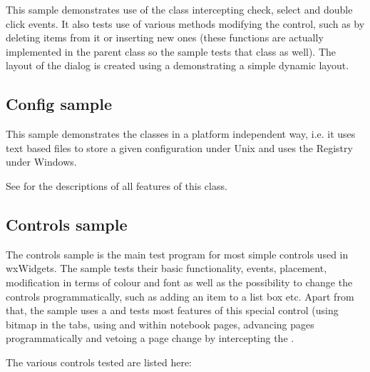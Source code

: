 This sample demonstrates use of the 
class intercepting check, select and double click events. It also tests
use of various methods modifying the control, such as by deleting items
from it or inserting new ones (these functions are actually implemented in
the parent class  so the sample tests that class
as well). The layout of the dialog is created using a 
demonstrating a simple dynamic layout.


\subsection{Config sample}\label{sampleconfig}

This sample demonstrates the  classes in a platform
independent way, i.e. it uses text based files to store a given configuration under
Unix and uses the Registry under Windows.

See  for the descriptions of all
features of this class.


\subsection{Controls sample}\label{samplecontrols}

The controls sample is the main test program for most simple controls used in
wxWidgets. The sample tests their basic functionality, events, placement,
modification in terms of colour and font as well as the possibility to change
the controls programmatically, such as adding an item to a list box etc. Apart
from that, the sample uses a  and tests most
features of this special control (using bitmap in the tabs, using
 and  within
notebook pages, advancing pages programmatically and vetoing a page change
by intercepting the .

The various controls tested are listed here:

